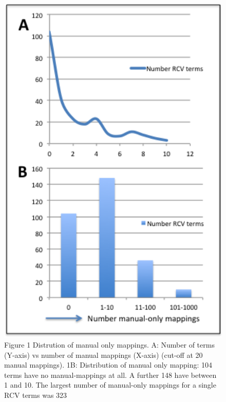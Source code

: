 \documentclass[runningheads,a4paper]{llncs}
\begin{document}
{{\begin{figure}
\centering
\includegraphics[width=160mm]{man_only.png}
\caption{Figure 1 Distrution of manual only mappings. A: Number of terms (Y-axis) vs number of manual mappings (X-axis) (cut-off at 20 manual mappings). 1B: Distribution of manual only mapping: 104 terms have no manual-mappings at all.  A further 148 have between 1 and 10.  The largest number of manual-only mappings for a single RCV terms was 323}
\label{fig:man_only}
\end{figure}

}}
\end{document}
